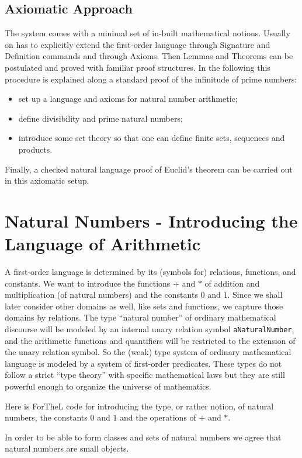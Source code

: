 \documentclass[11pt]{article}
\begin{document}
\subsection{Axiomatic Approach}

The \Naproche system
comes with a minimal set of in-built mathematical notions.
Usually on has to explicitly extend the first-order
language through Signature and Definition commands and through
Axioms. Then Lemmas and Theorems can be postulated and proved
with familiar proof structures. In the following this procedure
is explained along a standard proof of the infinitude of
prime numbers:
\begin{itemize}
\item
set up a language and axioms for natural number arithmetic;
\item
define divisibility and prime natural numbers;
\item
introduce some set theory so that one can define
finite sets, sequences and products.
\end{itemize}
Finally, a checked natural language proof of Euclid's theorem
can be carried out in this axiomatic setup.

\section{Natural Numbers - Introducing the Language of Arithmetic}

A first-order language is determined by its (symbols for)
relations, functions, and constants. We want to introduce
the functions $+$ and $*$ of addition and multiplication
(of natural numbers)
and the constants $0$ and $1$. Since we shall
later consider other domains as well, like sets and functions,
we capture those domains by relations. The type ``natural number''
of ordinary mathematical discourse will be modeled by an
internal unary relation symbol
\verb+aNaturalNumber+, and the arithmetic functions and
quantifiers will be
restricted to the extension of the unary relation symbol.
So the (weak) type system of ordinary mathematical language
is modeled by a system of first-order predicates. These
types do not follow a strict ``type theory'' with specific
mathematical laws but they are still powerful enough
to organize the universe of mathematics.

Here is ForTheL code for introducing the type, or rather
notion, of natural numbers, the constants $0$ and $1$
and the operations of $+$ and $*$.

In order to be able to form classes and sets of natural numbers
we agree that natural numbers are small objects.
\end{document}
